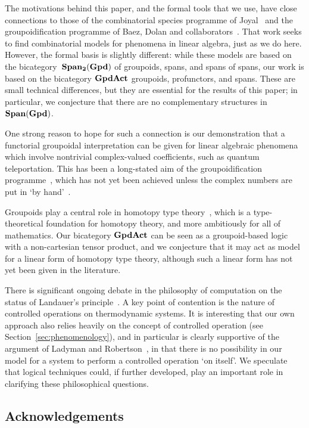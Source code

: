 \documentclass[a4paper,12pt]{article}
\theoremstyle{definition}
\newcommand\cat[1]{{\ensuremath{\bf #1}}}
\renewcommand{\-}[0]{\nobreakdash-\hspace{0pt}}
\newcommand\GA{\cat{GpdAct}{}}
\begin{document}
The motivations behind this paper, and the formal tools that we use,  have close connections to those of the combinatorial species programme of Joyal~\cite{bicategoryspecies, joyalspecies} and the groupoidification programme of Baez, Dolan and collaborators~\cite{b08-hda7, bd01-fsfd, m06-caqm, m10-ct, mv13-cha1}. That work seeks to find combinatorial models for phenomena in linear algebra, just as we do here. However, the formal basis is slightly different: while these models are based on the bicategory~\cat{Span_2(Gpd)} of groupoids, spans, and spans of spans, our work is based on the bicategory $\GA$ groupoids, profunctors, and spans. These are small technical differences, but they are essential for the results of this paper; in particular, we conjecture that there are no complementary structures in \cat{Span(Gpd)}.

One strong reason to hope for such a connection is our demonstration that a functorial groupoidal interpretation  can be given for linear algebraic phenomena which involve nontrivial complex-valued coefficients, such as quantum teleportation. This has been  a long-stated aim of the groupoidification programme~\cite[Section~1]{b08-hda7}, which has not yet been achieved unless the complex numbers are put in `by hand'~\cite{m06-caqm}.

Groupoids play a central role in homotopy type theory~\cite{hofmannstreicher, htt}, which is a type-theoretical foundation for homotopy theory, and more ambitiously for all of mathematics. Our bicategory \cat{GpdAct} can be seen as a groupoid-based logic with a non-cartesian tensor product, and we conjecture that it may act as model for a linear form of homotopy type theory, although such a linear form has not yet been given in the literature.

There is significant ongoing debate in the philosophy of computation on the status of Landauer's principle~\cite{lps08, lr13-ld, n11-wfl}. A key point of contention is the nature of controlled operations on thermodynamic systems. It is interesting that our own approach also relies heavily on the concept of controlled operation (see Section~\ref{sec:phenomenology}), and in particular is clearly supportive of the argument of Ladyman and Robertson~\cite[Section 4]{lr13-ld}, in that there is no possibility in our model for a system to perform a controlled operation `on itself'. We speculate that logical techniques could, if further developed, play an important role in clarifying these philosophical questions.

\subsection{Acknowledgements}
\end{document}

